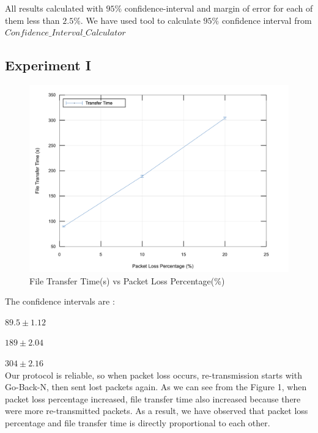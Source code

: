 All results calculated with $95\%$ confidence-interval and margin of error for each of them less than $2.5\%$. We have used tool to calculate $95\%$ confidence interval from
\href{https://www.mathsisfun.com/data/confidence-interval-calculator.html}{$Confidence\_Interval\_Calculator$}
\subsection{Experiment I}
\begin{figure}[ht]
   \centering
   \includegraphics[scale=.45]{images/exp1.png}
    \caption{File Transfer Time(s) vs Packet Loss Percentage(\%)}
    \label{fig:topology}
\end{figure}
The confidence intervals are :

$89.5 \pm 1.12$

$189 \pm 2.04$

$304 \pm 2.16$\\
Our protocol is reliable, so when packet loss occurs, re-transmission starts with Go-Back-N, then sent lost packets again. As we can see from the Figure 1, when packet loss percentage increased, file transfer time also increased because there were more re-transmitted packets. As a result, we have observed that packet loss percentage and file transfer time is directly proportional to each other.
\newpage
